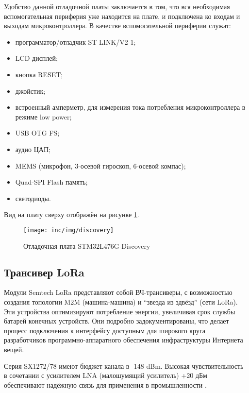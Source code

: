 Удобство данной отладочной платы заключается в том, что вся необходимая вспомогательная периферия уже находится на плате, и подключена ко входам и выходам микроконтроллера.
В качестве вспомогательной периферии служат:

\begin{itemize}
 \item программатор/отладчик ST-LINK/V2-1;
 \item LCD дисплей;
 \item кнопка RESET;
 \item джойстик;
 \item встроенный амперметр, для измерения тока потребления микроконтроллера в режиме low power;
 \item USB OTG FS;
 \item аудио ЦАП;
 \item MEMS (микрофон, 3-осевой гироскоп, 6-осевой компас);
 \item Quad-SPI Flash память;
 \item светодиоды.
\end{itemize}

Вид на плату сверху отображён на рисунке \ref{fig:discovery}.

\begin{figure}[!h]
  \centering
  \texttt{[image: inc/img/discovery]}
  \caption{Отладочная плата STM32L476G-Discovery}
  \label{fig:discovery}
\end{figure}

\subsection{Трансивер LoRa}

Модули Semtech LoRa представляют собой ВЧ-трансиверы, с возможностью создания 
топологии M2M (машина-машина) и ``звезда из здвёзд'' (сети LoRa). 
Эти устройства оптимизируют потребление энергии, увеличивая срок службы батарей 
конечных устройств.
Они подробно задокументированы, что делает процесс подключения к интерфейсу
 доступным для широкого круга разработчиков программно-аппаратного обеспечения 
инфраструктуры Интернета вещей.

Серия SX1272/78 имеют бюджет канала в -148 dBm. 
Высокая чувствительность в сочетании с усилителем LNA (малошумящий усилитель)
 +20 дБм обеспечивают надёжную связь для применения в промышленности 
\cite{Rizzi2017}.


